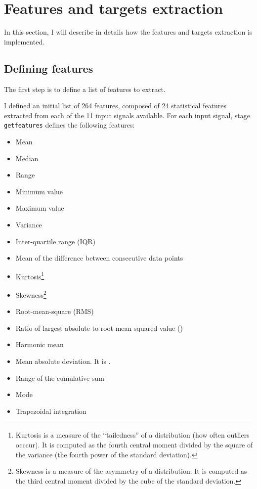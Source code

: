 \section{Features and targets extraction}\label{sec:extractfeaturestargets}

In this section, I will describe in details how the features and targets
extraction is implemented.

\subsection{Defining features}\label{subsec:getfeaturesstage}

The first step is to define a list of features to extract.

I defined an initial list of 264 features, composed of 24 statistical features
extracted from each of the 11 input signals available. For each input signal,
stage \texttt{getfeatures} defines the following features:

\noindent\underline{}
\begin{multicols}{2}
\begin{itemize}
\item Mean
\item Median
\item Range
\item Minimum value
\item Maximum value
\item Variance
\item Inter-quartile range (IQR)
\item Mean of the difference between consecutive data points
\item Kurtosis\footnote{Kurtosis is a measure of the ``tailedness'' of a
	distribution (how often outliers occcur). It is computed as the fourth
	central moment divided by the square of the variance (the fourth power
	of the standard deviation).}
\item Skewness\footnote{Skewness is a measure of the asymmetry of a
	distribution. It is computed as the third central moment divided by the
	cube of the standard deviation.}
\item Root-mean-square (RMS)
\item Ratio of largest absolute to root mean squared value ()
\item Harmonic mean
\item Mean absolute deviation. It is .
\item Range of the cumulative sum
\item Mode
\item Trapezoidal integration
\end{itemize}
\end{multicols}

